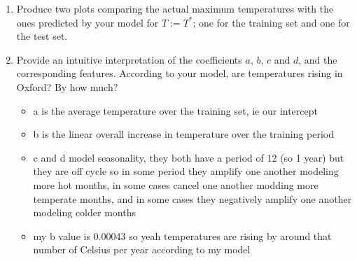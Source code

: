 \documentclass[12pt,twoside]{article}
\begin{document}
\begin{enumerate}
\begin{enumerate}
\begin{itemize}
    \end{itemize}
  \item Produce two plots comparing the actual maximum temperatures with
    the ones predicted by your model for $T:=T^{\ast}$; one for the training set and one for the test set. 
   \item Provide an intuitive interpretation of the coefficients $a$, $b$, $c$ and $d$, and the corresponding features. According to your model, are temperatures rising in Oxford? By how much?
   \begin{itemize}
     \color{blue}
       \item a is the average temperature over the training set, ie our intercept 
       \item b is the linear overall increase in temperature over the training period 
       \item c and d model seasonality, they both have a period of 12 (so 1 year) but they are off cycle so in some period they amplify one another modeling more hot months, in some cases cancel one another modding more temperate months, and in some cases they negatively amplify one another modeling colder months
       \item my b value is 0.00043 so yeah temperatures are rising by around that number of Celsius per year according to my model
   \end{itemize}
  \end{enumerate}

\end{enumerate}
 
\end{document}
